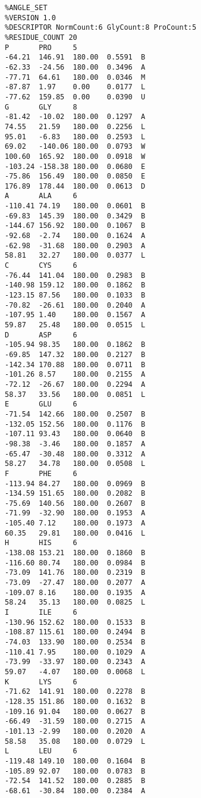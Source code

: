 \begin{small}
\begin{verbatim}
%ANGLE_SET
%VERSION 1.0
%DESCRIPTOR NormCount:6 GlyCount:8 ProCount:5
%RESIDUE_COUNT 20
P       PRO     5               
-64.21  146.91  180.00  0.5591  B
-62.33  -24.56  180.00  0.3496  A
-77.71  64.61   180.00  0.0346  M
-87.87  1.97    0.00    0.0177  L
-77.62  159.85  0.00    0.0390  U
G       GLY     8
-81.42  -10.02  180.00  0.1297  A
74.55   21.59   180.00  0.2256  L
95.01   -6.83   180.00  0.2593  L
69.02   -140.06 180.00  0.0793  W
100.60  165.92  180.00  0.0918  W
-103.24 -158.38 180.00  0.0680  E
-75.86  156.49  180.00  0.0850  E
176.89  178.44  180.00  0.0613  D
A       ALA     6
-110.41 74.19   180.00  0.0601  B
-69.83  145.39  180.00  0.3429  B
-144.67 156.92  180.00  0.1067  B
-92.68  -2.74   180.00  0.1624  A
-62.98  -31.68  180.00  0.2903  A
58.81   32.27   180.00  0.0377  L
C       CYS     6
-76.44  141.04  180.00  0.2983  B
-140.98 159.12  180.00  0.1862  B
-123.15 87.56   180.00  0.1033  B
-70.82  -26.61  180.00  0.2040  A
-107.95 1.40    180.00  0.1567  A
59.87   25.48   180.00  0.0515  L
D       ASP     6
-105.94 98.35   180.00  0.1862  B
-69.85  147.32  180.00  0.2127  B
-142.34 170.88  180.00  0.0711  B
-101.26 8.57    180.00  0.2155  A
-72.12  -26.67  180.00  0.2294  A
58.37   33.56   180.00  0.0851  L
E       GLU     6
-71.54  142.66  180.00  0.2507  B
-132.05 152.56  180.00  0.1176  B
-107.11 93.43   180.00  0.0640  B
-98.38  -3.46   180.00  0.1857  A
-65.47  -30.48  180.00  0.3312  A
58.27   34.78   180.00  0.0508  L
F       PHE     6
-113.94 84.27   180.00  0.0969  B
-134.59 151.65  180.00  0.2082  B
-75.69  140.56  180.00  0.2607  B
-71.99  -32.90  180.00  0.1953  A
-105.40 7.12    180.00  0.1973  A
60.35   29.81   180.00  0.0416  L
H       HIS     6
-138.08 153.21  180.00  0.1860  B
-116.60 80.74   180.00  0.0984  B
-73.09  141.76  180.00  0.2319  B
-73.09  -27.47  180.00  0.2077  A
-109.07 8.16    180.00  0.1935  A
58.24   35.13   180.00  0.0825  L
I       ILE     6
-130.96 152.62  180.00  0.1533  B
-108.87 115.61  180.00  0.2494  B
-74.03  133.90  180.00  0.2534  B
-110.41 7.95    180.00  0.1029  A
-73.99  -33.97  180.00  0.2343  A
59.07   -4.07   180.00  0.0068  L
K       LYS     6
-71.62  141.91  180.00  0.2278  B
-128.35 151.86  180.00  0.1632  B
-109.16 91.04   180.00  0.0627  B
-66.49  -31.59  180.00  0.2715  A
-101.13 -2.99   180.00  0.2020  A
58.58   35.08   180.00  0.0729  L
L       LEU     6
-119.48 149.10  180.00  0.1604  B
-105.89 92.07   180.00  0.0783  B
-72.54  141.52  180.00  0.2885  B
-68.61  -30.84  180.00  0.2384  A

\end{verbatim}
\end{small}
